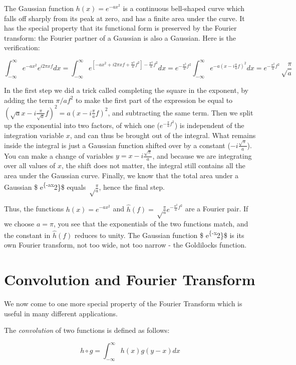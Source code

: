 \documentclass[
  letterpaper,
  DIV=11,
  numbers=noendperiod]{scrreprt}
\begin{document}
The Gaussian function \(h(x)= e^{-ax^2}\) is a continuous bell-shaped
curve which falls off sharply from its peak at zero, and has a finite
area under the curve. It has the special property that its functional
form is preserved by the Fourier transform: the Fourier partner of a
Gaussian is also a Gaussian. Here is the verification:

\[
\int_{-\infty} ^\infty e^{-ax^2} e^{i2\pi xf} dx = \int_{-\infty} ^\infty e^{[-ax^2+i2\pi xf +\frac{\pi^2}{a}f^2] - \frac{\pi^2}{a}f^2}dx = e^{- \frac{\pi^2}{a}f^2} \int_{-\infty} ^\infty e^{-a(x-i\frac{\pi}{a}f)^2}dx = e^{- \frac{\pi^2}{a}f^2}  \sqrt\frac{\pi}{a}
\]

In the first step we did a trick called completing the square in the
exponent, by adding the term \(\pi/a f^2\) to make the first part of the
expression be equal to
\((\sqrt{a}x-i\frac{\pi}{\sqrt{a}}f)^2=a(x-i\frac{\pi}{a}f)^2\), and
subtracting the same term. Then we split up the exponential into two
factors, of which one (\(e^{- \frac{\pi}{a}f^2}\)) is independent of the
integration variable \(x\), and can thus be brought out of the integral.
What remains inside the integral is just a Gaussian function shifted
over by a constant (\(-i\frac{\sqrt\pi}{a}\)). You can make a change of
variables \(y=x-i\frac{\sqrt\pi}{a}\), and because we are integrating
over all values of \(x\), the shift does not matter, the integral still
contains all the area under the Gaussian curve. Finally, we know that
the total area under a Gaussian \$ e\textsuperscript{\{-ax}2\}\$ equals
\(\sqrt\frac{\pi}{a}\), hence the final step.

Thus, the functions \(h(x)= e^{-ax^2}\) and
\(\widehat h(f) = \sqrt\frac{\pi}{a} e^{- \frac{\pi^2}{a}f^2}\) are a
Fourier pair. If we choose \(a = \pi\), you see that the exponentials of
the two functions match, and the constant in \(\widehat h(f)\) reduces
to unity. The Gaussian function \$ e\textsuperscript{\{-\pi x}2\}\$ is
its own Fourier transform, not too wide, not too narrow - the Goldilocks
function.

\section{Convolution and Fourier
Transform}\label{convolution-and-fourier-transform}

We now come to one more special property of the Fourier Transform which
is useful in many different applications.

\begin{tcolorbox}[enhanced jigsaw, colback=white, coltitle=black, bottomrule=.15mm, breakable, bottomtitle=1mm, titlerule=0mm, arc=.35mm, leftrule=.75mm, title=\textcolor{quarto-callout-note-color}{\faInfo}\hspace{0.5em}{Definition}, colbacktitle=quarto-callout-note-color!10!white, toprule=.15mm, toptitle=1mm, opacitybacktitle=0.6, rightrule=.15mm, left=2mm, colframe=quarto-callout-note-color-frame, opacityback=0]

The \emph{convolution} of two functions is defined as follows:

\[ h\circ g = \int _{-\infty} ^\infty h(x) g(y-x) dx \]

\end{tcolorbox}
\end{document}
